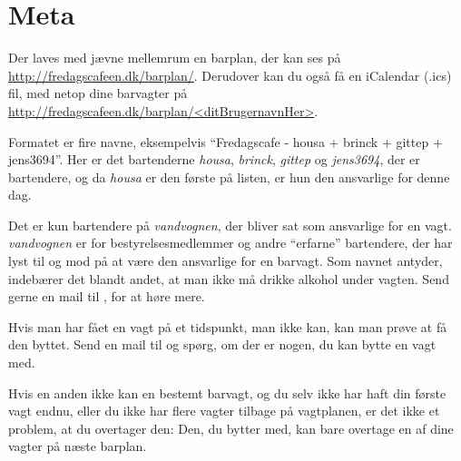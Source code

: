 \section{Meta}
\label{sec:meta}

Der laves med jævne mellemrum en barplan, der kan ses på
\url{http://fredagscafeen.dk/barplan/}. Derudover kan du også få en
iCalendar (.ics) fil, med netop dine barvagter på
\url{http://fredagscafeen.dk/barplan/<ditBrugernavnHer>}.

Formatet er fire navne, eksempelvis ``Fredagscafe - housa + brinck +
gittep + jens3694''. Her er det bartenderne \emph{housa},
\emph{brinck}, \emph{gittep} og \emph{jens3694}, der er bartendere, og
da \emph{housa} er den første på listen, er hun den ansvarlige for
denne dag.

Det er kun bartendere på \emph{vandvognen}, der bliver sat som
ansvarlige for en vagt. \emph{vandvognen} er for bestyrelsesmedlemmer
og andre ``erfarne'' bartendere, der har lyst til og mod på at være
den ansvarlige for en barvagt. Som navnet antyder, indebærer det
blandt andet, at man ikke må drikke alkohol under vagten. Send gerne
en mail til , for at høre mere.

Hvis man har fået en vagt på et tidspunkt, man ikke kan, kan man prøve
at få den byttet. Send en mail til  og
spørg, om der er nogen, du kan bytte en vagt med.

Hvis en anden ikke kan en bestemt barvagt, og du selv ikke har haft
din første vagt endnu, eller du ikke har flere vagter tilbage på
vagtplanen, er det ikke et problem, at du overtager den: Den, du
bytter med, kan bare overtage en af dine vagter på næste barplan.



